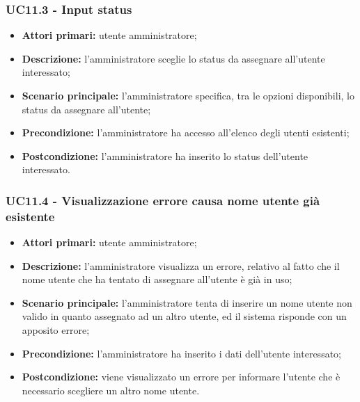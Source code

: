 \subsubsection{UC11.3 - Input status}
\begin{itemize}
	\item \textbf{Attori primari:} utente amministratore;
	\item \textbf{Descrizione:} l'amministratore sceglie lo status da assegnare all'utente interessato;
	\item \textbf{Scenario principale:} l'amministratore specifica, tra le opzioni disponibili, lo status da assegnare all'utente;
	\item \textbf{Precondizione:} l'amministratore ha accesso all'elenco degli utenti esistenti;
	\item \textbf{Postcondizione:} l'amministratore ha inserito lo status dell'utente interessato.
\end{itemize}

\subsubsection{UC11.4 - Visualizzazione errore causa nome utente già esistente}
	\begin{itemize}
		\item \textbf{Attori primari:} utente amministratore;
		\item \textbf{Descrizione:} l'amministratore visualizza un errore, relativo al fatto che il nome utente che ha tentato di assegnare all'utente è già in uso;
		\item \textbf{Scenario principale:} l'amministratore tenta di inserire un nome utente non valido in quanto assegnato ad un altro utente, ed il sistema risponde con un apposito errore;
		\item \textbf{Precondizione:} l'amministratore ha inserito i dati dell'utente interessato;
		\item \textbf{Postcondizione:} viene visualizzato un errore per informare l'utente che è necessario scegliere un altro nome utente.
	\end{itemize}

